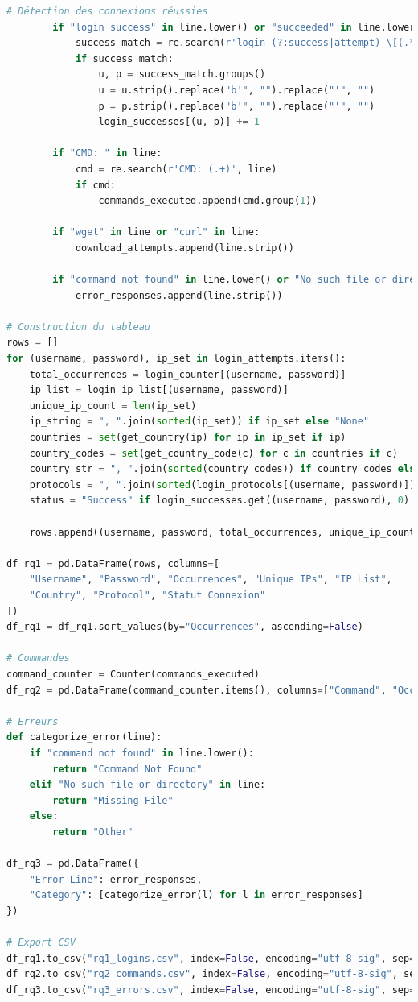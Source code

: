 \begin{lstlisting}[language=python,label={lst:cowrie-python},caption={Post-Attack Analysis Python Script}]
        # Détection des connexions réussies
        if "login success" in line.lower() or "succeeded" in line.lower():
            success_match = re.search(r'login (?:success|attempt) \[(.*?)\/(.*?)\]', line)
            if success_match:
                u, p = success_match.groups()
                u = u.strip().replace("b'", "").replace("'", "")
                p = p.strip().replace("b'", "").replace("'", "")
                login_successes[(u, p)] += 1

        if "CMD: " in line:
            cmd = re.search(r'CMD: (.+)', line)
            if cmd:
                commands_executed.append(cmd.group(1))

        if "wget" in line or "curl" in line:
            download_attempts.append(line.strip())

        if "command not found" in line.lower() or "No such file or directory" in line:
            error_responses.append(line.strip())

# Construction du tableau
rows = []
for (username, password), ip_set in login_attempts.items():
    total_occurrences = login_counter[(username, password)]
    ip_list = login_ip_list[(username, password)]
    unique_ip_count = len(ip_set)
    ip_string = ", ".join(sorted(ip_set)) if ip_set else "None"
    countries = set(get_country(ip) for ip in ip_set if ip)
    country_codes = set(get_country_code(c) for c in countries if c)
    country_str = ", ".join(sorted(country_codes)) if country_codes else "??"
    protocols = ", ".join(sorted(login_protocols[(username, password)]))
    status = "Success" if login_successes.get((username, password), 0) > 0 else "Failure"

    rows.append((username, password, total_occurrences, unique_ip_count, ip_string, country_str, protocols, status))

df_rq1 = pd.DataFrame(rows, columns=[
    "Username", "Password", "Occurrences", "Unique IPs", "IP List",
    "Country", "Protocol", "Statut Connexion"
])
df_rq1 = df_rq1.sort_values(by="Occurrences", ascending=False)

# Commandes
command_counter = Counter(commands_executed)
df_rq2 = pd.DataFrame(command_counter.items(), columns=["Command", "Occurrences"]).sort_values(by="Occurrences", ascending=False)

# Erreurs
def categorize_error(line):
    if "command not found" in line.lower():
        return "Command Not Found"
    elif "No such file or directory" in line:
        return "Missing File"
    else:
        return "Other"

df_rq3 = pd.DataFrame({
    "Error Line": error_responses,
    "Category": [categorize_error(l) for l in error_responses]
})

# Export CSV
df_rq1.to_csv("rq1_logins.csv", index=False, encoding="utf-8-sig", sep=";")
df_rq2.to_csv("rq2_commands.csv", index=False, encoding="utf-8-sig", sep=";")
df_rq3.to_csv("rq3_errors.csv", index=False, encoding="utf-8-sig", sep=";")
\end{lstlisting} 

